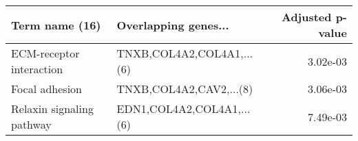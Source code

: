 \begin{tabular}{llr}
\toprule
           Term name (16) &      Overlapping genes... &  Adjusted p-value \\
\midrule
 ECM-receptor interaction & TNXB,COL4A2,COL4A1,...(6) &          3.02e-03 \\
           Focal adhesion &   TNXB,COL4A2,CAV2,...(8) &          3.06e-03 \\
Relaxin signaling pathway & EDN1,COL4A2,COL4A1,...(6) &          7.49e-03 \\
\bottomrule
\end{tabular}

